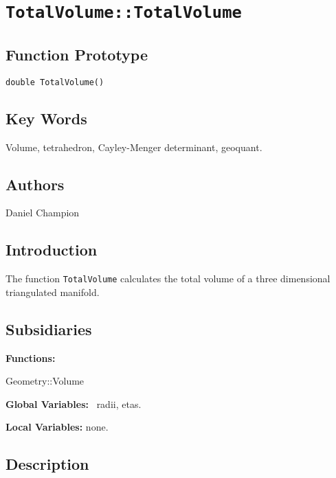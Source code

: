                       

\section*{\texttt{TotalVolume::TotalVolume}}

\subsection*{Function Prototype}

\texttt{double TotalVolume()}

\subsection*{Key Words}

Volume, tetrahedron, Cayley-Menger determinant, geoquant.

\subsection*{Authors}

Daniel Champion

\subsection*{Introduction}

The function \texttt{TotalVolume} calculates the total volume of a three
dimensional triangulated manifold.

\subsection*{Subsidiaries}

\textbf{Functions:}

\qquad Geometry::Volume

\textbf{Global Variables:} \ radii, etas.

\textbf{Local Variables:} none.

\subsection*{Description}


